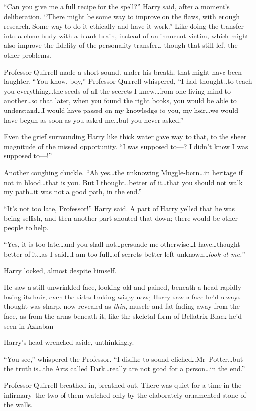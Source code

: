 “Can you give me a full recipe for the spell?” Harry said, after a moment’s deliberation. “There might be some way to improve on the flaws, with enough research. Some way to do it ethically and have it work.” Like doing the transfer into a clone body with a blank brain, instead of an innocent victim, which might also improve the fidelity of the personality transfer… though that still left the other problems.

Professor Quirrell made a short sound, under his breath, that might have been laughter. “You know, boy,” Professor Quirrell whispered, “I had thought…to teach you everything…the seeds of all the secrets I knew…from one living mind to another…so that later, when you found the right books, you would be able to understand…I would have passed on my knowledge to you, my heir…we would have begun as soon as you asked me…but you never asked.”

Even the grief surrounding Harry like thick water gave way to that, to the sheer magnitude of the missed opportunity. “I was supposed to—? I didn’t know I was supposed to—!”

Another coughing chuckle. “Ah yes…the unknowing Muggle-born…in heritage if not in blood…that is you. But I thought…better of it…that you should not walk my path…it was not a good path, in the end.”

“It’s not too late, Professor!” Harry said. A part of Harry yelled that he was being selfish, and then another part shouted that down; there would be other people to help.

“Yes, it is too late…and you shall not…persuade me otherwise…I have…thought better of it…as I said…I am too full…of secrets better left unknown…\emph{look at me.}”

Harry looked, almost despite himself.

He saw a still-unwrinkled face, looking old and pained, beneath a head rapidly losing its hair, even the sides looking wispy now; Harry saw a face he’d always thought was sharp, now revealed as \emph{thin}, muscle and fat fading away from the face, as from the arms beneath it, like the skeletal form of Bellatrix Black he’d seen in Azkaban—

Harry’s head wrenched aside, unthinkingly.

“You see,” whispered the Professor. “I dislike to sound cliched…Mr~Potter…but the truth is…the Arts called Dark…really are not good for a person…in the end.”

Professor Quirrell breathed in, breathed out. There was quiet for a time in the infirmary, the two of them watched only by the elaborately ornamented stone of the walls.

